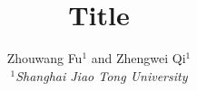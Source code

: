 \documentclass[10pt,twocolumn]{article}
\begin{document}
\title{Title}
\author{Zhouwang Fu$^1$ and Zhengwei Qi$^1$ \\
\small {\em  $^1$Shanghai Jiao Tong University} \\ [2mm]
}
\date{}
\maketitle















\end{document}

